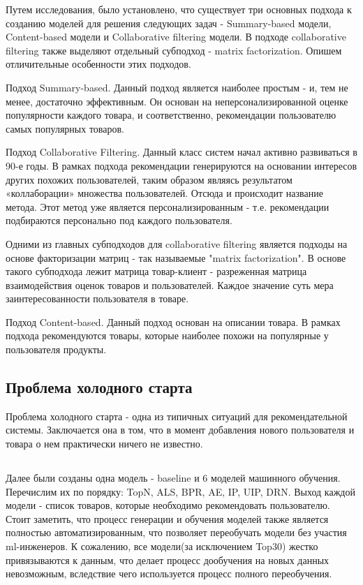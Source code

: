 \documentclass[14pt]{mmcs_article}
\begin{document}
Путем исследования, было установлено, что существует три основных подхода к созданию моделей для решения следующих задач - Summary-based модели, Content-based модели и Collaborative filtering модели. В подходе collaborative filtering также выделяют отдельный субподход - matrix factorization.  Опишем отличительные особенности этих подходов. 

Подход Summary-based. Данный подход является наиболее простым - и, тем не менее, достаточно эффективным. Он основан на неперсонализированной оценке популярности каждого товара, и соответственно, рекомендации пользователю самых популярных товаров.

Подход Collaborative Filtering. Данный класс систем начал активно развиваться в 90-е годы. В рамках подхода рекомендации генерируются на основании интересов других похожих пользователей, таким образом являясь результатом «коллаборации» множества пользователей. Отсюда и  происходит название метода. Этот метод уже является персонализированным - т.е. рекомендации подбираются персонально под каждого пользователя.

Одними из главных субподходов для collaborative filtering является подходы на основе факторизации матриц - так называемые "matrix factorization". В основе такого субподхода лежит матрица товар-клиент - разреженная матрица взаимодействия оценок товаров и пользователей. Каждое значение суть мера заинтересованности пользователя в товаре. 

Подход  Content-based. Данный подход основан на описании товара. В рамках подхода рекомендуются товары, которые наиболее похожи на популярные у пользователя продукты.

\subsection{Проблема холодного старта}
Проблема холодного старта - одна из типичных ситуаций для рекомендательной системы. Заключается она в том, что в момент добавления нового пользователя и товара о нем практически ничего не известно.

\subsection{} 



Далее были созданы одна модель - baseline и 6 моделей машинного обучения. Перечислим их по порядку: TopN, ALS, BPR, AE, IP, UIP, DRN. Выход каждой модели - список товаров, которые необходимо рекомендовать пользователю. \\
Стоит заметить, что процесс генерации и обучения моделей также является полностью автоматизированным, что позволяет переобучать модели без участия ml-инженеров. К сожалению, все модели(за исключением Top30) жестко привязываются к данным, что делает процесс дообучения на новых данных невозможным, вследствие чего используется процесс полного переобучения.
\end{document}
